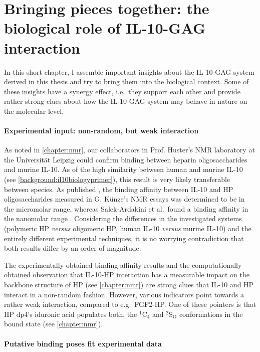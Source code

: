 \chapter{Bringing pieces together: the biological role of IL-10-GAG interaction}
\label{together}

In this short chapter, I assemble important insights about the IL-10-GAG system
derived in this thesis and try to bring them into the biological context. Some
of these insights have a synergy effect, i.e.\ they support each other and
provide rather strong clues about how the IL-10-GAG system may behave in nature
on the molecular level.


\subsubsection{Experimental input: non-random, but weak interaction}

As noted in \cref{chapter:nmr}, our collaborators in Prof. Huster's NMR
laboratory at the Universität Leipzig could confirm binding between heparin
oligosaccharides and murine IL-10. As of the high similarity between human and
murine IL-10 (see \cref{background:il10biologyprimer}), this result is very
likely transferable between species. As published \cite{kuenze_gehrcke_2014},
the binding affinity between IL-10 and HP oligosaccharides measured in G.
Künze's NMR essays was determined to be in the micromolar range, whereas
Salek-Ardakini et al.\ found a binding affinity in the nanomolar range
\cite{salek_ardakani_2000}. Considering the differences in the investigated
systems (polymeric HP \textit{versus} oligomeric HP, human IL-10 \textit{versus}
murine IL-10) and the entirely different experimental techniques, it is no
worrying contradiction that both results differ by an order of magnitude.

The experimentally obtained binding affinity results and the computationally
obtained observation that IL-10-HP interaction has a measurable impact on the
backbone structure of HP (see \cref{chapter:nmr}) are strong clues that IL-10
and HP interact in a non-random fashion. However, various indicators point
towards a rather weak interaction, compared to e.g.\ FGF2-HP. One of these
pointers is that HP dp4's iduronic acid populates both, the ${}^1$C${}_4$ and
${}^2$S${}_\mathrm{O}$ conformations in the bound state (see
\cref{chapter:nmr}).


\subsubsection{Putative binding poses fit experimental data}

